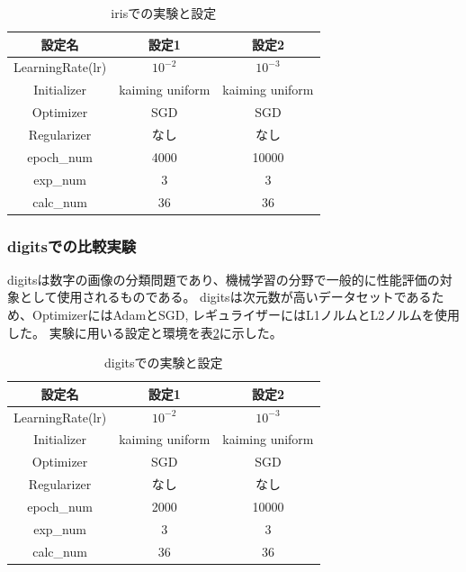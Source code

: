 \begin{table}[htbp]
\label{exp:iris}
    \begin{center}
        \caption{irisでの実験と設定}
        \label{exp:iris}
        \vspace{2mm} 
        \begin{tabular}{ |c|c|c| }
        設定名 & 設定1 & 設定2 \\
        \hline
        LearningRate(lr)         & $ 10^{-2} $ & $ 10^{-3} $ \\
        Initializer       & kaiming uniform &  kaiming uniform \\
        Optimizer           & SGD & SGD \\
        Regularizer     & なし & なし \\
        epoch\_num       & 4000 &  10000 \\
        exp\_num         & 3 & 3 \\
        calc\_num        & 36 & 36 \\
        \end{tabular}
    \end{center}
\end{table}



\subsubsection{digitsでの比較実験}
\label{impl:digits}

digitsは数字の画像の分類問題であり、機械学習の分野で一般的に性能評価の対象として使用されるものである。
digitsは次元数が高いデータセットであるため、OptimizerにはAdamとSGD, レギュライザーにはL1ノルムとL2ノルムを使用した。
実験に用いる設定と環境を表\ref{exp:digits}に示した。

\begin{table}[htbp]
    \begin{center}
        \caption{digitsでの実験と設定}
        \label{exp:digits}
        \vspace{2mm} 
        \begin{tabular}{ |c|c|c| }
        設定名 & 設定1 & 設定2 \\
        \hline
        LearningRate(lr)         & $ 10^{-2} $ & $ 10^{-3} $ \\
        Initializer       & kaiming uniform &  kaiming uniform \\
        Optimizer           & SGD & SGD \\
        Regularizer     & なし & なし \\
        epoch\_num       & 2000 &  10000 \\
        exp\_num         & 3 & 3 \\
        calc\_num        & 36 & 36 \\
        \end{tabular}
    \end{center}
\end{table}




